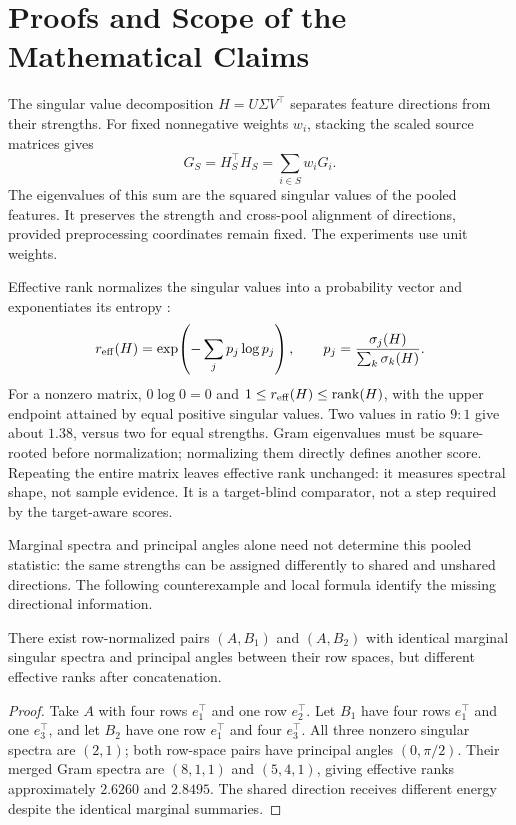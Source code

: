 \section{Proofs and Scope of the Mathematical Claims}
\label{app:proofs}
The singular value decomposition $H=U\Sigma V^\top$ separates feature directions from their strengths. For fixed nonnegative weights $w_i$, stacking the scaled source matrices gives
\begin{equation}
 G_S=H_S^\top H_S=\sum_{i\in S}w_iG_i.
 \label{eq:gram}
\end{equation}
The eigenvalues of this sum are the squared singular values of the pooled features. It preserves the strength and cross-pool alignment of directions, provided preprocessing coordinates remain fixed. The experiments use unit weights.

Effective rank normalizes the singular values into a probability vector and exponentiates its entropy \citep{roy2007}:
\begin{equation}
 r_{\mathrm{eff}}(H)=\exp\!\left(-\sum_j p_j\log p_j\right),\qquad
 p_j=\frac{\sigma_j(H)}{\sum_k\sigma_k(H)}.
 \label{eq:rank}
\end{equation}
For a nonzero matrix, $0\log0=0$ and $1\leq r_{\mathrm{eff}}(H)\leq\operatorname{rank}(H)$, with the upper endpoint attained by equal positive singular values. Two values in ratio $9:1$ give about $1.38$, versus two for equal strengths. Gram eigenvalues must be square-rooted before normalization; normalizing them directly defines another score. Repeating the entire matrix leaves effective rank unchanged: it measures spectral shape, not sample evidence. It is a target-blind comparator, not a step required by the target-aware scores.

Marginal spectra and principal angles alone need not determine this pooled statistic: the same strengths can be assigned differently to shared and unshared directions. The following counterexample and local formula identify the missing directional information.

\begin{proposition}
There exist row-normalized pairs $(A,B_1)$ and $(A,B_2)$ with identical marginal singular spectra and principal angles between their row spaces, but different effective ranks after concatenation.
\end{proposition}
\begin{proof}
Take $A$ with four rows $e_1^\top$ and one row $e_2^\top$. Let $B_1$ have four rows $e_1^\top$ and one $e_3^\top$, and let $B_2$ have one row $e_1^\top$ and four $e_3^\top$. All three nonzero singular spectra are $(2,1)$; both row-space pairs have principal angles $(0,\pi/2)$. Their merged Gram spectra are $(8,1,1)$ and $(5,4,1)$, giving effective ranks approximately $2.6260$ and $2.8495$. The shared direction receives different energy despite the identical marginal summaries.
\end{proof}

